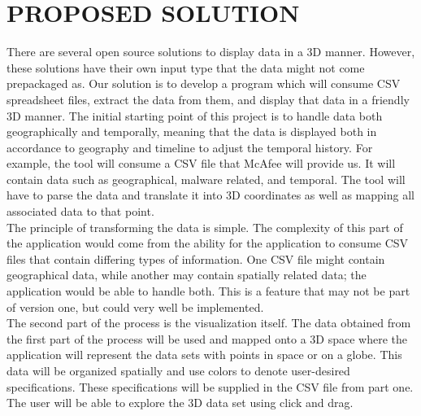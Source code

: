 \documentclass[journal,10pt,onecolumn,compsoc]{IEEEtran} \usepackage[margin=1.0in]{geometry} \usepackage{pdfpages}
\begin{document}
\section{PROPOSED SOLUTION}
There are several open source solutions to display data in a 3D manner. However, these solutions have their own input type that the data might not come prepackaged as. Our solution is to develop a program which will consume CSV spreadsheet files, extract the data from them, and display that data in a friendly 3D manner. The initial starting point of this project is to handle data both geographically and temporally, meaning that the data is displayed both in accordance to geography and timeline to adjust the temporal history. For example, the tool will consume a CSV file that McAfee will provide us. It will contain data such as geographical, malware related, and temporal. The tool will have to parse the data and translate it into 3D coordinates as well as mapping all associated data to that point.\\
\newline
 The principle of transforming the data is simple. The complexity of this part of the application would come from the ability for the application to consume CSV files that contain differing types of information. One CSV file might contain geographical data, while another may contain spatially related data; the application would be able to handle both. This is a feature that may not be part of version one, but could very well be implemented.\\
\newline
The second part of the process is the visualization itself. The data obtained from the first part of the process will be used and mapped onto a 3D space where the application will represent the data sets with points in space or on a globe. This data will be organized spatially and use colors to denote user-desired specifications. These specifications will be supplied in the CSV file from part one. The user will be able to explore the 3D data set using click and drag.
    
\end{document}
